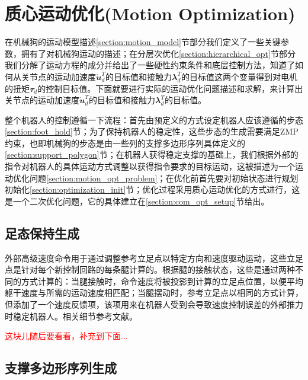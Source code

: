 \section[质心运动优化(Motion Optimization)]{质心运动优化(Motion Optimization)\cite[p3]{Bellicoso_Jenelten_Fankhauser_Gehring_Hwangbo_Hutter_2017}}
在机械狗的运动模型描述\ref{section:motion_model}节部分我们定义了一些关键参数，拥有了对机械狗运动的描述；在分层次优化\ref{section:hierarchical_opt}节部分我们分解了运动方程的成分并给出了一些硬性约束条件和底层控制方法，知道了如何从关节点的运动加速度$\mathbfit{\dot u}_d^T$的目标值和接触力$\mathbfit{\lambda}_d^T$的目标值这两个变量得到对电机的扭矩$\mathbfit{\tau}_d$的控制目标值。下面就要进行实际的运动优化问题描述和求解，来计算出关节点的运动加速度$\mathbfit{\dot u}_d^T$的目标值和接触力$\mathbfit{\lambda}_d^T$的目标值。

整个机器人的控制遵循一下流程：首先由预定义的方式设定机器人应该遵循的步态\ref{section:foot_hold}节；为了保持机器人的稳定性，这些步态的生成需要满足ZMP约束，也即机械狗的步态是由一些列的支撑多边形序列具体定义的\ref{section:support_polygon}节；在机器人获得稳定支撑的基础上，我们根据外部的指令对机器人的具体运动方式调整以获得指令要求的目标运动，这被描述为一个运动优化问题\ref{section:motion_opt_problem}；在优化前首先要对初始状态进行规划初始化\ref{section:optimization_init}节；优化过程采用质心运动优化的方式进行，这是一个二次优化问题，它的具体建立在\ref{section:com_opt_setup}节给出。

\subsection[足态保持生成]{\label{section:foot_hold}足态保持生成}
外部高级速度命令用于通过调整参考立足点以特定方向和速度驱动运动，这些立足点是针对每个新控制回路的每条腿计算的。根据腿的接触状态，这些是通过两种不同的方式计算的：当腿接触时，命令速度将被投影到计算的立足点位置，以便平均躯干速度与所需的运动速度相匹配；当腿摆动时，参考立足点以相同的方式计算，但添加了一个速度反馈项，该项用来在机器人受到会导致速度控制误差的外部推力时稳定机器人。相关细节参考文献\cite{Gehring_Coros_Hutter_Bellicoso_Heijnen_Diethelm_Bloesch_Fankhauser_Hwangbo_Hoepflinger_et_al_2016}。

\textcolor{red}{这块儿随后要看看，补充到下面...}

\subsection[支撑多边形序列生成]{\label{section:support_polygon}支撑多边形序列生成}

